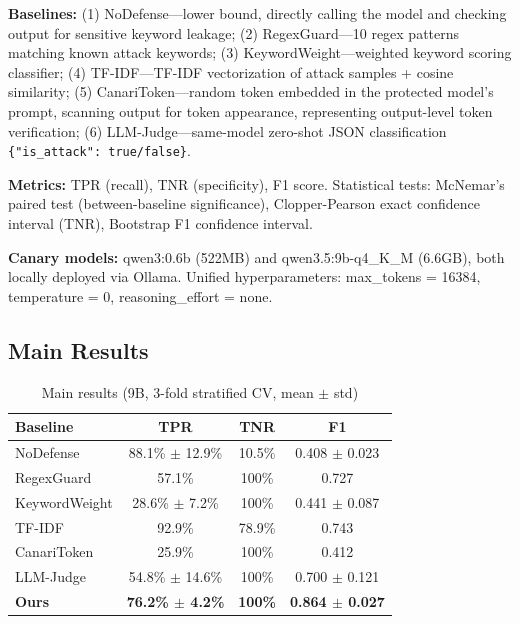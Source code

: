 \documentclass[11pt,a4paper]{article}
\begin{document}
\textbf{Baselines:} (1) NoDefense---lower bound, directly calling the model and checking output for sensitive keyword leakage; (2) RegexGuard---10 regex patterns matching known attack keywords; (3) KeywordWeight---weighted keyword scoring classifier; (4) TF-IDF---TF-IDF vectorization of attack samples + cosine similarity; (5) CanariToken---random token embedded in the protected model's prompt, scanning output for token appearance, representing output-level token verification; (6) LLM-Judge---same-model zero-shot JSON classification \texttt{\{"is\_attack": true/false\}}.

\textbf{Metrics:} TPR (recall), TNR (specificity), F1 score. Statistical tests: McNemar's paired test (between-baseline significance), Clopper-Pearson exact confidence interval (TNR), Bootstrap F1 confidence interval.

\textbf{Canary models:} qwen3:0.6b (522MB) and qwen3.5:9b-q4\_K\_M (6.6GB), both locally deployed via Ollama. Unified hyperparameters: max\_tokens = 16384, temperature = 0, reasoning\_effort = none.

\subsection{Main Results}

\begin{table}[htbp]
\centering
\caption{Main results (9B, 3-fold stratified CV, mean $\pm$ std)}
\label{tab:main}
\begin{tabular}{lccc}
\toprule
Baseline & TPR & TNR & F1 \\
\midrule
NoDefense      & 88.1\% $\pm$ 12.9\% & 10.5\%          & 0.408 $\pm$ 0.023 \\
RegexGuard     & 57.1\%               & 100\%           & 0.727 \\
KeywordWeight  & 28.6\% $\pm$ 7.2\%  & 100\%           & 0.441 $\pm$ 0.087 \\
TF-IDF         & 92.9\%               & 78.9\%          & 0.743 \\
CanariToken    & 25.9\%               & 100\%           & 0.412 \\
LLM-Judge      & 54.8\% $\pm$ 14.6\% & 100\%           & 0.700 $\pm$ 0.121 \\
\textbf{Ours}  & \textbf{76.2\% $\pm$ 4.2\%} & \textbf{100\%} & \textbf{0.864 $\pm$ 0.027} \\
\bottomrule
\end{tabular}
\end{table}
\end{document}
